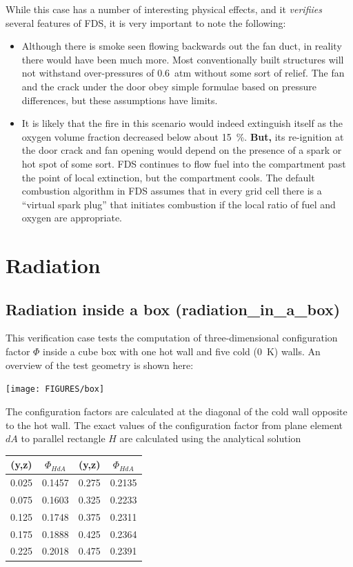 \documentclass[11pt]{book}
\begin{document}
While this case has a number of interesting physical effects, and it {\em verifiies} several features of FDS, it is very important to note the following:
\begin{itemize}
\item Although there is smoke seen flowing backwards out the fan duct, in reality there would have been much more. Most conventionally built structures will not withstand over-pressures
of 0.6~atm without some sort of relief. The fan and the crack under the door obey simple formulae based on pressure differences, but these assumptions have limits.
\item It is likely that the fire in this scenario would indeed extinguish itself as the oxygen volume fraction decreased below about 15~\%. {\bf But,} its re-ignition at the door crack
and fan opening would depend on the presence of a spark or hot spot of some sort. FDS continues to flow fuel into the compartment past the point of local extinction, but the compartment
cools. The default combustion algorithm in FDS assumes that in every grid cell there is a ``virtual spark plug'' that initiates combustion if the local ratio of fuel and oxygen are
appropriate.
\end{itemize}





\clearpage

\section{Radiation}

\subsection{Radiation inside a box ({\bf radiation\_in\_a\_box}) }
\label{radiation_in_a_box}

This verification case tests the computation of three-dimensional
configuration factor $\Phi$ inside a cube box with one hot wall and
five cold (0~K) walls. An overview of the test geometry is shown here:
\begin{center}
\texttt{[image: FIGURES/box]}
\end{center}
The configuration factors are calculated at the
diagonal of the cold wall opposite to the hot wall. The exact values of the configuration factor
from plane element $dA$ to parallel rectangle $H$
are calculated using the analytical solution~\cite{Siegel:1}

\begin{center}
\begin{tabular}{|c|c|c|c|}
\hline (y,z) & $\Phi_{HdA}$ & (y,z) & $\Phi_{HdA}$ \\ \hline \hline
0.025   &0.1457 & 0.275 &0.2135 \\
0.075   &0.1603 & 0.325 &0.2233 \\
0.125   &0.1748 & 0.375 &0.2311 \\
0.175   &0.1888 & 0.425 &0.2364 \\
0.225   &0.2018 & 0.475 &0.2391 \\ \hline
\end{tabular}
\end{center}
\end{document}
